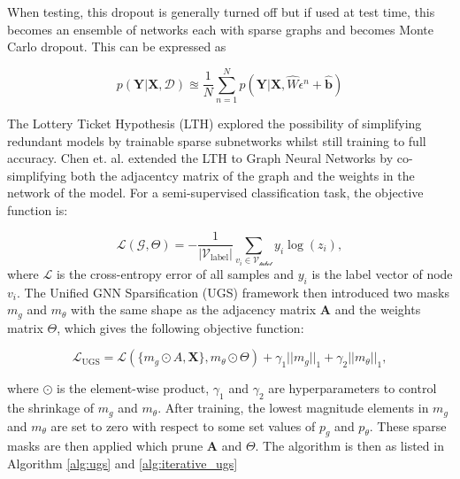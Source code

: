 \documentclass[honours,12pt]{unswthesis}
\numberwithin{equation}{section}
\begin{document}
{\noindent}When testing, this dropout is generally turned off but if used at test time, this becomes an ensemble of networks each with sparse graphs\cite{gal2016dropout}\cite{kendall2017uncertainties} 
and becomes Monte Carlo dropout. This can be expressed as

\begin{equation}
    p(\textbf{Y} | \textbf{X}, \mathcal{D}) \approxeq \frac{1}{N} \sum_{n=1}^{N}{p(\textbf{Y} | \textbf{X}, \hat{W}\epsilon^n+\hat{\textbf{b}})}
\end{equation}

{\noindent}The Lottery Ticket Hypothesis (LTH)\cite{frankle2020linear} explored the possibility of simplifying redundant models by trainable sparse subnetworks whilst
still training to full accuracy. Chen et. al.\cite{chen2021unified} extended the LTH to Graph Neural Networks by co-simplifying both the adjacentcy matrix of the graph and the weights in 
the network of the model. For a semi-supervised classification task, the objective function is:

\begin{equation}
    \mathcal{L}(\mathcal{G}, \Theta) = -\frac{1}{|\mathcal{V}_{\text{label}}|}\sum_{v_i \in \mathcal{V_{\text{label}}}} y_i \log{(z_i)},
\end{equation}
where $\mathcal{L}$ is the cross-entropy error of all samples and $y_i$ is the label vector of node $v_i$. The Unified GNN Sparsification (UGS)
framework then introduced two masks $m_g$ and $m_\theta$ with the same shape as the adjacency matrix $\textbf{A}$ and the weights matrix $\Theta$, which
gives the following objective function:

\begin{equation}\label{eqn:l_ugs}
    \mathcal{L}_{\text{UGS}} = \mathcal{L}(\{m_g \odot A, \textbf{X}\}, m_\theta \odot \Theta) + \gamma_1 ||m_g||_1 + \gamma_2 ||m_\theta||_1,
\end{equation}

\noindent where $\odot$ is the element-wise product, $\gamma_1$ and $\gamma_2$ are hyperparameters to control the shrinkage of $m_g$ and $m_\theta$.
After training, the lowest magnitude elements in $m_g$ and $m_\theta$ are set to zero with respect to some set values of $p_g$ and $p_\theta$.
These sparse masks are then applied which prune $\textbf{A}$ and $\Theta$. The algorithm is then as listed in Algorithm \ref{alg:ugs} and \ref{alg:iterative_ugs}
\end{document}
